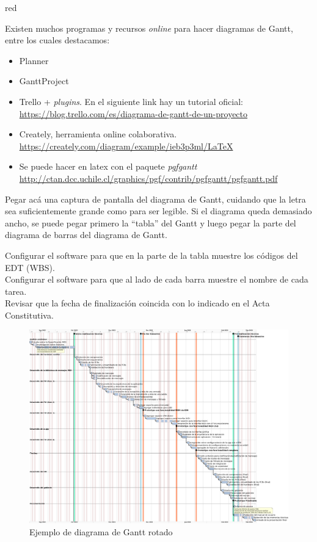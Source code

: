 \documentclass[
11pt, %
]{charter}
\begin{document}
\begin{consigna}{red}

Existen muchos programas y recursos \textit{online} para hacer diagramas de Gantt, entre los cuales destacamos:

\begin{itemize}
\item Planner
\item GanttProject
\item Trello + \textit{plugins}. En el siguiente link hay un tutorial oficial: \\ \url{https://blog.trello.com/es/diagrama-de-gantt-de-un-proyecto}
\item Creately, herramienta online colaborativa. \\\url{https://creately.com/diagram/example/ieb3p3ml/LaTeX}
\item Se puede hacer en latex con el paquete \textit{pgfgantt}\\ \url{http://ctan.dcc.uchile.cl/graphics/pgf/contrib/pgfgantt/pgfgantt.pdf}
\end{itemize}

Pegar acá una captura de pantalla del diagrama de Gantt, cuidando que la letra sea suficientemente grande como para ser legible. 
Si el diagrama queda demasiado ancho, se puede pegar primero la ``tabla'' del Gantt y luego pegar la parte del diagrama de barras del diagrama de Gantt.

Configurar el software para que en la parte de la tabla muestre los códigos del EDT (WBS).\\
Configurar el software para que al lado de cada barra muestre el nombre de cada tarea.\\
Revisar que la fecha de finalización coincida con lo indicado en el Acta Constitutiva.

\newpage

\begin{landscape}
\begin{figure}[h!]
\centering 
\includegraphics[height=1.05\textheight]{./Figuras/gantt.png}
\caption{Ejemplo de diagrama de Gantt rotado}
\label{fig:diagGantt}
\end{figure}

\end{landscape}

\end{consigna}
\end{document}

